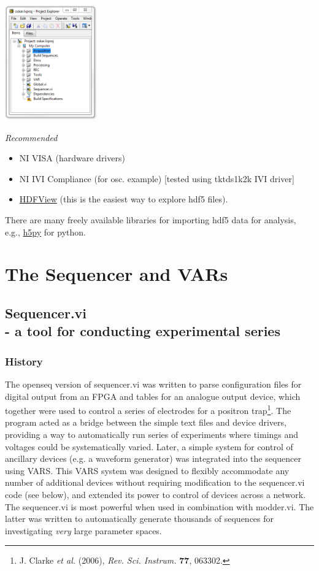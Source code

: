 \documentclass[10pt,a4paper]{article}
\begin{document}
\includegraphics[width=0.3\textwidth]{images/oskar.png}

\emph{Recommended}
\begin{itemize}
	\item NI VISA (hardware drivers)
    \item NI IVI Compliance (for osc. example) [tested using tktds1k2k IVI driver]
	\item  \href{https://www.hdfgroup.org/products/java/hdfview/}{HDFView} (this is the easiest way to explore hdf5 files).
\end{itemize}

There are many freely available libraries for importing hdf5 data for analysis, e.g., \href{http://www.h5py.org/}{h5py} for python.

\section{The Sequencer and VARs}
\subsection[Sequencer.vi]{\label{sex:seq}Sequencer.vi \\ %
	\normalsize - a tool for conducting experimental series}

\subsubsection{History}
The openseq version of sequencer.vi was written to parse configuration files for digital output from an FPGA and tables for an analogue output device, which together were used to control a series of electrodes for a positron trap\footnote{J. Clarke \emph{et al.} (2006), \emph{Rev. Sci. Instrum.} \textbf{77}, 063302.}.  The program acted as a bridge between the simple text files and device drivers, providing a way to automatically run series of experiments where timings and voltages could be systematically varied. Later, a simple system for control of ancillary devices (e.g. a waveform generator) was integrated into the sequencer using VARS.  This VARS system was designed to flexibly accommodate any number of additional devices without requiring modification to the sequencer.vi code  (see below), and extended its power to control of devices across a network.  The sequencer.vi is most powerful when used in combination with modder.vi.  The latter was written to automatically generate thousands of sequences for investigating \emph{very} large parameter spaces. 
\end{document}
